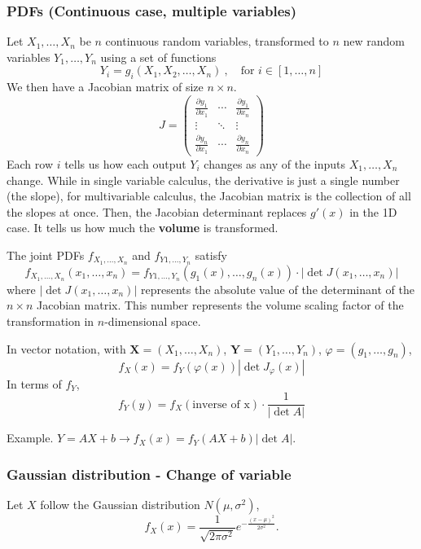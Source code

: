 \documentclass[../Probability.tex]{subfiles}
\begin{document}
\subsubsection{PDFs (Continuous case, multiple variables)}
Let $X_1,\ldots,X_n$ be $n$ continuous random variables, 
transformed to $n$ new random variables $Y_1,\ldots, Y_n$ using a set of functions
\[Y_i=g_i(X_1,X_2,\ldots,X_n)\:, \quad \text{for } i \in [1,\ldots,n]\]
We then have a Jacobian matrix of size $n\times n$.
\[
J = 
\begin{pmatrix}
    \frac{\partial y_1}{\partial x_1} & \cdots & \frac{\partial y_1}{\partial x_n} \\
    \vdots & \ddots & \vdots \\
    \frac{\partial y_n}{\partial x_1} & \cdots & \frac{\partial y_n}{\partial x_n}
\end{pmatrix}
\]
Each row $i$ tells us how each output $Y_i$ changes as any of the inputs $X_1,\ldots,X_n$ change.
While in single variable calculus, the derivative is just a single number (the slope), for multivariable calculus,
the Jacobian matrix is the collection of all the slopes at once.\newline
Then, the Jacobian determinant replaces $g'(x)$ in the 1D case. It tells us how much the \textbf{volume} is transformed.

\noindent The joint PDFs $f_{X_1,\ldots,X_n}$ and $f_{Y1,\ldots,Y_n}$ satisfy
\[f_{X_1,\ldots,X_n}(x_1,\ldots,x_n)=f_{Y1,\ldots,Y_n}(g_1(x),\ldots,g_n(x))\cdot |\det J(x_1,\ldots,x_n)|\]
where $|\det J(x_1,\ldots,x_n)|$ represents the absolute value of the determinant of the $n\times n$ Jacobian matrix.
This number represents the volume scaling factor of the transformation in $n$-dimensional space.

\noindent In vector notation, with $\mathbf{X}=(X_1,\ldots,X_n)$, $\mathbf{Y}=(Y_1,\ldots,Y_n)$, $\varphi=(g_1,\ldots,g_n)$,
\[f_X(x)=f_Y(\varphi(x))|\det J_{\varphi}(x)|\]
In terms of $f_Y$,
\[f_Y(y)=f_X(\text{inverse of x})\cdot \frac{1}{|\det A|}\]

\noindent Example. $Y=AX+b \rightarrow f_X(x)=f_Y(AX+b)|\det A|$.

\subsubsection{Gaussian distribution - Change of variable}
Let $X$ follow the Gaussian distribution $N(\mu, \sigma^2)$,
\[
    f_X(x) = \frac{1}{\sqrt{2\pi\sigma^2}} e^{-\frac{(x-\mu)^2}{2\sigma^2}}.
\]
\end{document}
